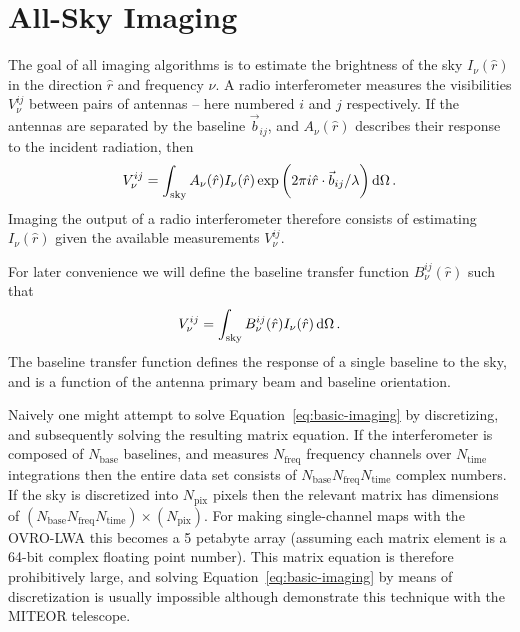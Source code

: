 \documentclass[twocolumn]{aastex61}
\renewcommand{\d}{{\rm d}}
\begin{document}
\section{All-Sky Imaging}

The goal of all imaging algorithms is to estimate the brightness of the sky $I_\nu(\hat r)$ in the
direction $\hat r$ and frequency $\nu$. A radio interferometer measures the visibilities
$V^{ij}_{\nu}$ between pairs of antennas -- here numbered $i$ and $j$ respectively. If the antennas
are separated by the baseline $\vec b_{ij}$, and $A_\nu(\hat r)$ describes their response to the
incident radiation, then
\begin{equation}\label{eq:basic-imaging}
    V^{ij}_\nu = \int_\text{sky}
                 A_\nu(\hat r) I_\nu(\hat r)
                 \exp\bigg(2\pi i \hat r\cdot\vec b_{ij}/\lambda\bigg) \,\d\Omega \, .
\end{equation}
Imaging the output of a radio interferometer therefore consists of estimating $I_\nu(\hat r)$ given
the available measurements $V^{ij}_\nu$.

For later convenience we will define the baseline transfer function $B^{ij}_\nu(\hat r)$ such that
\begin{equation}\label{eq:baseline-transfer-function}
    V^{ij}_\nu = \int_\text{sky} B^{ij}_\nu(\hat r) I_\nu(\hat r) \,\d\Omega \, .
\end{equation}
The baseline transfer function defines the response of a single baseline to the sky, and is a
function of the antenna primary beam and baseline orientation.

Naively one might attempt to solve Equation~\ref{eq:basic-imaging} by discretizing, and subsequently
solving the resulting matrix equation. If the interferometer is composed of $N_\text{base}$
baselines, and measures $N_\text{freq}$ frequency channels over $N_\text{time}$ integrations then
the entire data set consists of $N_\text{base}N_\text{freq}N_\text{time}$ complex numbers. If the
sky is discretized into $N_\text{pix}$ pixels then the relevant matrix has dimensions of
$(N_\text{base}N_\text{freq}N_\text{time})\times(N_\text{pix})$. For making single-channel maps with
the OVRO-LWA this becomes a 5 petabyte array (assuming each matrix element is a 64-bit complex
floating point number).  This matrix equation is therefore prohibitively large, and solving
Equation~\ref{eq:basic-imaging} by means of discretization is usually impossible although
\citet{2017MNRAS.465.2901Z} demonstrate this technique with the MITEOR telescope.
\end{document}

